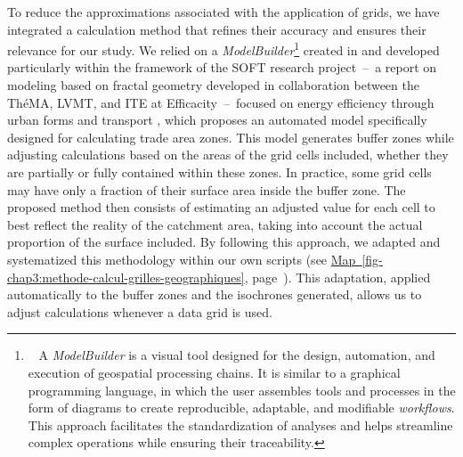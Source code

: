 \begin{refsegment}
To reduce the approximations associated with the application of grids, we have integrated a calculation method that refines their accuracy and ensures their relevance for our study. We relied on a \textsl{ModelBuilder}\footnote{~
    A \textsl{ModelBuilder} is a visual tool designed for the design, automation, and execution of geospatial processing chains. It is similar to a graphical programming language, in which the user assembles tools and processes in the form of diagrams to create reproducible, adaptable, and modifiable \textsl{workflows}. This approach facilitates the standardization of analyses and helps streamline complex operations while ensuring their traceability.
} created in  and developed particularly within the framework of the SOFT research project~–~a report on modeling based on fractal geometry developed in collaboration between the \acrfull{ThéMA}, \acrfull{LVMT}, and \acrfull{ITE} at Efficacity~–~focused on energy efficiency through urban forms and transport \textcolor{blue}{\autocite[123]{bonin_projet_2020}}, which proposes an automated model specifically designed for calculating trade area zones. This model generates buffer zones while adjusting calculations based on the areas of the grid cells included, whether they are partially or fully contained within these zones. In practice, some grid cells may have only a fraction of their surface area inside the buffer zone. The proposed method then consists of estimating an adjusted value for each cell to best reflect the reality of the catchment area, taking into account the actual proportion of the surface included. By following this approach, we adapted and systematized this methodology within our own scripts (see \hyperref[fig-chap3:methode-calcul-grilles-geographiques]{Map~\ref{fig-chap3:methode-calcul-grilles-geographiques}}, page~\pageref{fig-chap3:methode-calcul-grilles-geographiques}). This adaptation, applied automatically to the buffer zones and the isochrones generated, allows us to adjust calculations whenever a data grid is used.%


\end{refsegment}
